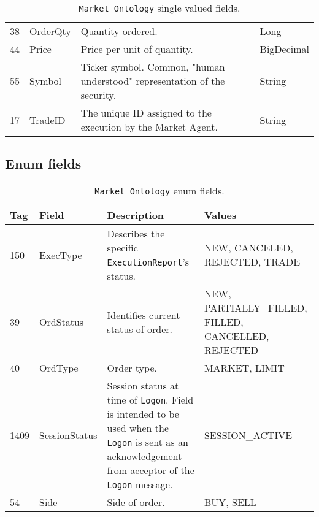 \begin{table}[htbp]
\begin{center}
\begin{tabular}{l l p{3.5in} l}
38  & OrderQty	& Quantity ordered.	& Long \\

44	& Price 	& Price per unit of quantity.	& BigDecimal  \\

55	& Symbol 	& Ticker symbol. Common, "human understood" representation of the security.	& String \\

17	& TradeID	& The unique ID assigned to the execution by the Market Agent. & String \\

\end{tabular}
\end{center}
\caption{\texttt{Market Ontology} single valued fields.}        
\end{table}

\pagebreak
\FloatBarrier
\subsection{Enum fields}
\begin{table}[ht]
\begin{center}
\begin{tabular}{l l p{3in} p{1.5in}}

\multicolumn{1}{l}{\textbf{Tag}}            &
\multicolumn{1}{l}{\textbf{Field}}  	    &
\multicolumn{1}{l}{\textbf{Description}}    & 
\multicolumn{1}{l}{\textbf{Values}}			\\              
\toprule

150  & ExecType  & Describes the specific \texttt{ExecutionReport}'s status. & 
NEW, CANCELED, REJECTED, TRADE \\

39	 & OrdStatus & Identifies current status of order. & NEW, PARTIALLY\_FILLED, FILLED, CANCELLED, REJECTED \\

40	 & OrdType	& Order type.	& MARKET, LIMIT	\\

1409 & SessionStatus	& Session status at time of \texttt{Logon}. Field is intended to be used when the \texttt{Logon} is sent as an acknowledgement from acceptor of the \texttt{Logon} message.	& SESSION\_ACTIVE  \\

54	& Side		& Side of order.	& BUY, SELL \\
\end{tabular}
\end{center}
\caption{\texttt{Market Ontology} enum fields.}        
\end{table}

